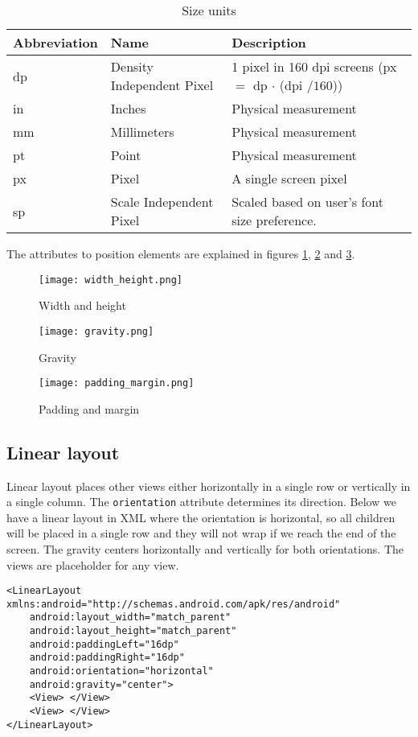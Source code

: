 \begin{table}[H]
    \centering
    \begin{tabular}{l|l|l}
        Abbreviation & Name & Description \\ 
        \hline
        dp & Density Independent Pixel & 1 pixel in 160 dpi screens (px $=$ dp $\cdot$ (dpi $/ 160$)) \\
        in & Inches & Physical measurement \\
        mm & Millimeters & Physical measurement \\
        pt & Point & Physical measurement \\
        px & Pixel & A single screen pixel \\
        sp & Scale Independent Pixel & Scaled based on user’s font size preference.
    \end{tabular}
    \caption{Size units}
    \label{table:units}
\end{table}%

The attributes to position elements are explained in figures \ref{fig:wah}, \ref{fig:grav} and \ref{fig:pam}.

\begin{figure}[H]
  \centering
  \texttt{[image: width\_height.png]}
  \caption{Width and height}
  \label{fig:wah}
\end{figure}
\begin{figure}[H]
  \centering
  \texttt{[image: gravity.png]}
  \caption{Gravity}
  \label{fig:grav}
\end{figure}
\begin{figure}[H]
  \centering
  \texttt{[image: padding\_margin.png]}
  \caption{Padding and margin}
  \label{fig:pam}
\end{figure}

\subsection{Linear layout}
Linear layout places other views either horizontally in a single row or vertically in a single column. The \texttt{orientation} attribute determines its direction. Below we have a linear layout in XML where the orientation is horizontal, so all children will be placed in a single row and they will not wrap if we reach the end of the screen. The gravity centers horizontally and vertically for both orientations. The views are placeholder for any view.
\begin{lstlisting}[style=A_XML]
<LinearLayout xmlns:android="http://schemas.android.com/apk/res/android"
    android:layout_width="match_parent"
    android:layout_height="match_parent"
    android:paddingLeft="16dp"
    android:paddingRight="16dp"
    android:orientation="horizontal"
    android:gravity="center">
    <View> </View>
    <View> </View>
</LinearLayout>
\end{lstlisting}

